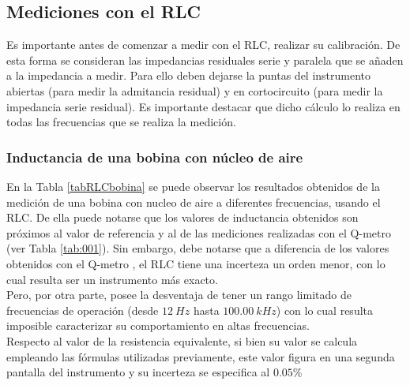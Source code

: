 \documentclass[a4paper,10pt]{article}
\begin{document}
	\subsection{Mediciones con el RLC}		
		\indent Es importante antes de comenzar a medir con el RLC, realizar su 
		calibraci\'on. De esta forma se consideran las impedancias residuales 
		serie y paralela que se a\~naden a la impedancia a medir. Para ello 
		deben dejarse la puntas del instrumento abiertas (para medir la 
		admitancia residual) y en cortocircuito (para medir la impedancia serie 
		residual). Es importante destacar que dicho cálculo lo realiza en 
		todas las frecuencias que se realiza la medición.

		\subsubsection{Inductancia de una bobina con n\'ucleo de aire}
		
		\indent En la Tabla \ref{tabRLCbobina} se puede observar los resultados 
		obtenidos de la medici\'on de una bobina con nucleo de aire a diferentes
		frecuencias, usando el RLC. De ella puede notarse que los valores de 
		inductancia obtenidos son pr\'oximos al valor de referencia y al de las 
		mediciones realizadas con el Q-metro (ver Tabla \ref{tab:001}). Sin 
		embargo, debe notarse que a diferencia de los valores obtenidos con el 
		Q-metro , el RLC tiene una incerteza un orden menor, con lo cual resulta
		ser un instrumento m\'as exacto. \\
		\indent Pero, por otra parte, posee la desventaja de tener un rango 
		limitado de frecuencias de operaci\'on (desde $12~Hz$ hasta 
		$100.00~kHz$) con lo cual resulta imposible caracterizar su 
		comportamiento en altas frecuencias. \\
		\indent Respecto al valor de la resistencia equivalente, si bien su 
		valor se calcula empleando las f\'ormulas utilizadas previamente, este 
		valor figura en una segunda pantalla del instrumento y su incerteza se 
		especifica al $0.05\%$
		
\end{document}
